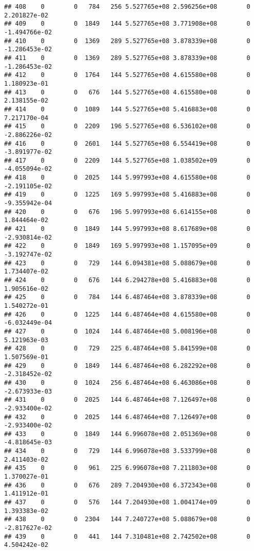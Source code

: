 \documentclass[
]{article}
\begin{document}
\begin{enumerate}
\begin{verbatim}
## 408    0        0   784   256 5.527765e+08 2.596256e+08        0  2.201827e-02
## 409    0        0  1849   144 5.527765e+08 3.771908e+08        0 -1.494766e-02
## 410    0        0  1369   289 5.527765e+08 3.878339e+08        0 -1.286453e-02
## 411    0        0  1369   289 5.527765e+08 3.878339e+08        0 -1.286453e-02
## 412    0        0  1764   144 5.527765e+08 4.615580e+08        0  1.180923e-01
## 413    0        0   676   144 5.527765e+08 4.615580e+08        0  2.138155e-02
## 414    0        0  1089   144 5.527765e+08 5.416883e+08        0  7.217170e-04
## 415    0        0  2209   196 5.527765e+08 6.536102e+08        0 -2.886226e-02
## 416    0        0  2601   144 5.527765e+08 6.554419e+08        0 -3.891977e-02
## 417    0        0  2209   144 5.527765e+08 1.038502e+09        0 -4.055094e-02
## 418    0        0  2025   144 5.997993e+08 4.615580e+08        0 -2.191105e-02
## 419    0        0  1225   169 5.997993e+08 5.416883e+08        0 -9.355942e-04
## 420    0        0   676   196 5.997993e+08 6.614155e+08        0  1.844464e-02
## 421    0        0  1849   144 5.997993e+08 8.617689e+08        0 -2.930814e-02
## 422    0        0  1849   169 5.997993e+08 1.157095e+09        0 -3.192747e-02
## 423    0        0   729   144 6.094381e+08 5.088679e+08        0  1.734407e-02
## 424    0        0   676   144 6.294278e+08 5.416883e+08        0  1.905616e-02
## 425    0        0   784   144 6.487464e+08 3.878339e+08        0  1.540272e-01
## 426    0        0  1225   144 6.487464e+08 4.615580e+08        0 -6.032449e-04
## 427    0        0  1024   144 6.487464e+08 5.008196e+08        0  5.121963e-03
## 428    0        0   729   225 6.487464e+08 5.841599e+08        0  1.507569e-01
## 429    0        0  1849   144 6.487464e+08 6.282292e+08        0 -2.318452e-02
## 430    0        0  1024   256 6.487464e+08 6.463086e+08        0 -2.673933e-03
## 431    0        0  2025   144 6.487464e+08 7.126497e+08        0 -2.933400e-02
## 432    0        0  2025   144 6.487464e+08 7.126497e+08        0 -2.933400e-02
## 433    0        0  1849   144 6.996078e+08 2.051369e+08        0 -4.818645e-03
## 434    0        0   729   144 6.996078e+08 3.533799e+08        0  2.411403e-02
## 435    0        0   961   225 6.996078e+08 7.211803e+08        0  1.370027e-01
## 436    0        0   676   289 7.204930e+08 6.372343e+08        0  1.411912e-01
## 437    0        0   576   144 7.204930e+08 1.004174e+09        0  1.393383e-02
## 438    0        0  2304   144 7.240727e+08 5.088679e+08        0 -2.817627e-02
## 439    0        0   441   144 7.310481e+08 2.742502e+08        0  4.504242e-02

\end{verbatim}
\end{enumerate}
\end{document}
